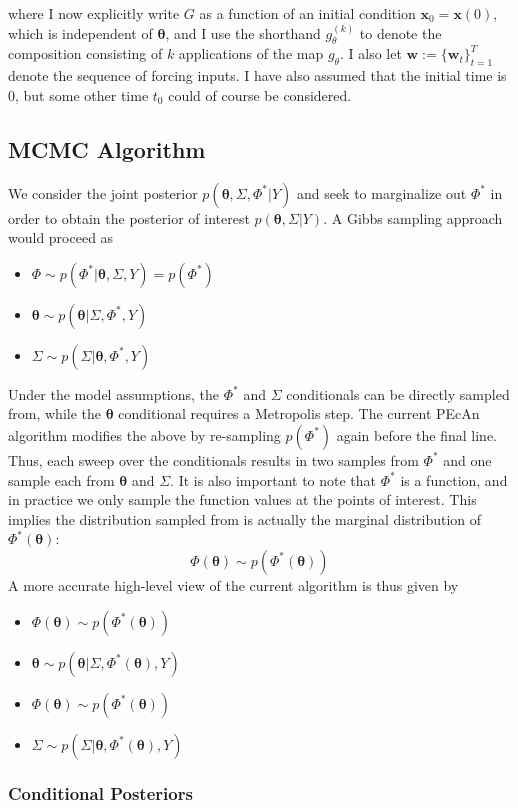 \documentclass[12pt]{article}
\newcommand{\btheta}{\boldsymbol{\theta}}
\newcommand{\bx}{\mathbf{x}}
\newcommand{\bw}{\mathbf{w}}
\begin{document}
 where I now explicitly write $G$ as a function of an initial condition $\bx_0 = \bx(0)$, which is independent of $\btheta$, and I use the shorthand $g_\theta^{(k)}$ to denote 
 the composition consisting of $k$ applications of the map $g_\theta$. I also let $\bw := \{\bw_t\}_{t = 1}^{T}$ denote the sequence of forcing inputs. 
 I have also assumed that the initial time is $0$, but some other time $t_0$ could of course be considered. 

\subsection{MCMC Algorithm}
We consider the joint posterior $p(\btheta, \Sigma, \Phi^*|Y)$ and seek to marginalize out $\Phi^*$ in order to obtain the posterior of interest $p(\btheta, \Sigma|Y)$. A Gibbs sampling approach would proceed as 
\begin{itemize}
\item $\Phi \sim p(\Phi^*|\btheta, \Sigma, Y) = p(\Phi^*)$
\item $\btheta \sim p(\btheta|\Sigma, \Phi^*, Y)$
\item $\Sigma \sim p(\Sigma|\btheta, \Phi^*, Y)$
\end{itemize}
Under the model assumptions, the $\Phi^*$ and $\Sigma$ conditionals can be directly sampled from, while the $\btheta$ conditional requires a Metropolis step. The current PEcAn algorithm modifies the above by re-sampling 
$p(\Phi^*)$ again before the final line. Thus, each sweep over the conditionals results in two samples from $\Phi^*$ and one sample each from $\btheta$ and $\Sigma$. It is also important to note that 
$\Phi^*$ is a function, and in practice we only sample the function values at the points of interest. This implies the distribution sampled from is actually the marginal distribution of $\Phi^*(\btheta)$:
\[\Phi(\btheta) \sim p(\Phi^*(\btheta))\]
A more accurate high-level view of the current algorithm is thus given by 
\begin{itemize}
\item $\Phi(\btheta) \sim p(\Phi^*(\btheta))$
\item $\btheta \sim p(\btheta|\Sigma, \Phi^*(\btheta), Y)$
\item $\Phi(\btheta) \sim p(\Phi^*(\btheta))$
\item $\Sigma \sim p(\Sigma|\btheta, \Phi^*(\btheta), Y)$
\end{itemize}

\subsubsection{Conditional Posteriors}
\end{document}
